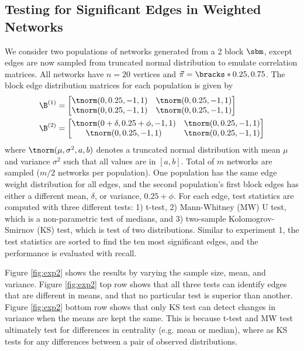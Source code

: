 \subsection{Testing for Significant Edges in Weighted Networks} \label{sec:exp2}
We consider two populations of networks generated from a 2 block $\sbm$, except edges are now sampled from truncated normal distribution to emulate correlation matrices. All networks have $n=20$ vertices and $\vec{\pi} = \bracks*{0.25, 0.75}$. The block edge distribution matrices for each population is given by
\begin{align*}
    \B^{(1)} &= 
    \begin{bmatrix}
        \tnorm(0, 0.25, -1, 1)   & \tnorm(0, 0.25, -1, 1) \\
        \tnorm(0, 0.25, -1, 1)   & \tnorm(0, 0.25, -1, 1) 
    \end{bmatrix} \\
    \B^{(2)} &= 
    \begin{bmatrix}
        \tnorm(0 + \delta, 0.25 + \phi, -1, 1)   & \tnorm(0, 0.25, -1, 1) \\
        \tnorm(0, 0.25, -1, 1)   & \tnorm(0, 0.25, -1, 1) 
    \end{bmatrix}
\end{align*}
where $\tnorm(\mu, \sigma^2, a, b)$ denotes a truncated normal distribution with mean $\mu$ and variance $\sigma^2$ such that all values are in $[a, b]$. Total of $m$ networks are sampled ($m/2$ networks per population). One population has the same edge weight distribution for all edges, and the second population's first block edges has either a different mean, $\delta$, or variance, $0.25 + \phi$.
For each edge, test statistics are computed with three different tests: 1) t-test, 2) Mann-Whitney (MW) U test, which is a non-parametric test of medians, and 3) two-sample Kolomogrov-Smirnov (KS) test, which is test of two distributions. Similar to experiment 1, the test statistics are sorted to find the ten most significant edges, and the performance is evaluated with recall.

Figure \ref{fig:exp2} shows the results by varying the sample size, mean, and variance. Figure \ref{fig:exp2} top row shows that all three tests can identify edges that are different in means, and that no particular test is superior than another. 
Figure \ref{fig:exp2} bottom row shows that only KS test can detect changes in variance when the means are kept the same. This is because t-test and MW test ultimately test for differences in centrality (e.g. mean or median), where as KS tests for any differences between a pair of observed distributions. 

